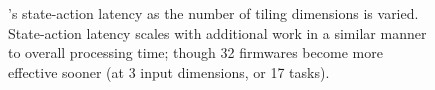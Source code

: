 \begin{figure}
	\caption[\approachshort{}'s state-action latency as the number of tiling dimensions is varied.]{\approachshort{}'s state-action latency as the number of tiling dimensions is varied. State-action latency scales with additional work in a similar manner to overall processing time; though \qty{32}{\bit} firmwares become more effective sooner (at \num{3} input dimensions, or \num{17} tasks).\label{fig:vary-work-latency}}
\end{figure}

